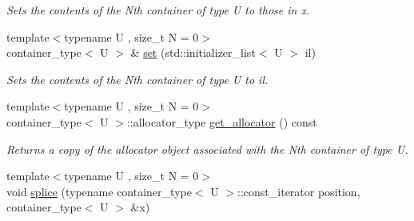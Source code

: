 \begin{DoxyCompactItemize}
\begin{DoxyCompactList}\small\item\em Sets the contents of the Nth container of type U to those in x. \end{DoxyCompactList}\item 
\hypertarget{classheterogeneous_1_1heterolist_3_01_t_00_01_types_8_8_8_4_aec5db4ed8b48caeb4b03e9512dd9bc5a}{}{\footnotesize template$<$typename U , size\+\_\+t N = 0$>$ }\\container\+\_\+type$<$ U $>$ \& \hyperlink{classheterogeneous_1_1heterolist_3_01_t_00_01_types_8_8_8_4_aec5db4ed8b48caeb4b03e9512dd9bc5a}{set} (std\+::initializer\+\_\+list$<$ U $>$ il)\label{classheterogeneous_1_1heterolist_3_01_t_00_01_types_8_8_8_4_aec5db4ed8b48caeb4b03e9512dd9bc5a}

\begin{DoxyCompactList}\small\item\em Sets the contents of the Nth container of type U to il. \end{DoxyCompactList}\item 
\hypertarget{classheterogeneous_1_1heterolist_3_01_t_00_01_types_8_8_8_4_a791a6869df0c597ac907980b1159e8a1}{}{\footnotesize template$<$typename U , size\+\_\+t N = 0$>$ }\\container\+\_\+type$<$ U $>$\+::allocator\+\_\+type \hyperlink{classheterogeneous_1_1heterolist_3_01_t_00_01_types_8_8_8_4_a791a6869df0c597ac907980b1159e8a1}{get\+\_\+allocator} () const \label{classheterogeneous_1_1heterolist_3_01_t_00_01_types_8_8_8_4_a791a6869df0c597ac907980b1159e8a1}

\begin{DoxyCompactList}\small\item\em Returns a copy of the allocator object associated with the Nth container of type U. \end{DoxyCompactList}\item 
\hypertarget{classheterogeneous_1_1heterolist_3_01_t_00_01_types_8_8_8_4_a4f70421fc89df5cee3d8dab1d9be97b3}{}{\footnotesize template$<$typename U , size\+\_\+t N = 0$>$ }\\void \hyperlink{classheterogeneous_1_1heterolist_3_01_t_00_01_types_8_8_8_4_a4f70421fc89df5cee3d8dab1d9be97b3}{splice} (typename container\+\_\+type$<$ U $>$\+::const\+\_\+iterator position, container\+\_\+type$<$ U $>$ \&x)\label{classheterogeneous_1_1heterolist_3_01_t_00_01_types_8_8_8_4_a4f70421fc89df5cee3d8dab1d9be97b3}


\end{DoxyCompactItemize}
